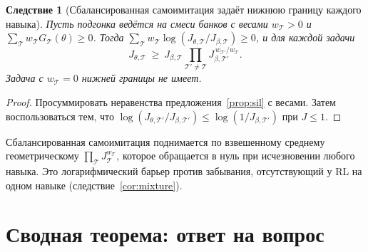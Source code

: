 \documentclass[11pt,a4paper]{article}
\theoremstyle{plain}
\newtheorem{corollary}[theorem]{Следствие}
\theoremstyle{definition}
\theoremstyle{remark}
\newcommand{\cT}{\mathcal{T}}
\begin{document}
\begin{corollary}[Сбалансированная самоимитация задаёт нижнюю границу каждого навыка]\label{cor:sil-floor}
Пусть подгонка ведётся на смеси банков с весами $w_\cT>0$ и $\sum_\cT w_\cT G_\cT(\theta)\ge0$. Тогда $\sum_\cT w_\cT\log(J_{\theta,\cT}/J_{\beta,\cT})\ge0$, и для каждой задачи
\[
J_{\theta,\cT}\ \ge\ J_{\beta,\cT}\prod_{\cT'\ne\cT}J_{\beta,\cT'}^{\,w_{\cT'}/w_\cT} .
\]
Задача с $w_\cT=0$ нижней границы не имеет.
\end{corollary}
\begin{proof}
Просуммировать неравенства предложения~\ref{prop:sil} с весами. Затем воспользоваться тем, что $\log(J_{\theta,\cT'}/J_{\beta,\cT'})\le\log(1/J_{\beta,\cT'})$ при $J\le1$.
\end{proof}

Сбалансированная самоимитация поднимается по взвешенному среднему геометрическому $\prod_\cT J_\cT^{w_\cT}$, которое обращается в нуль при исчезновении любого навыка. Это логарифмический барьер против забывания, отсутствующий у RL на одном навыке (следствие~\ref{cor:mixture}).

\section{Сводная теорема: ответ на вопрос}\label{sec:main}
\end{document}
